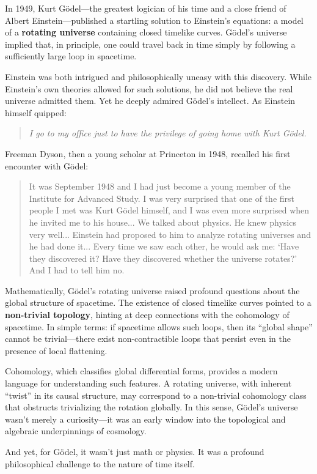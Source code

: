 \begin{tcolorbox}[colback=blue!5!white, colframe=blue!75!black, breakable, title={Sidebar: Gödel, Einstein, and the Rotating Universe}, fonttitle=\bfseries]

    In 1949, Kurt Gödel—the greatest logician of his time and a close friend of Albert Einstein—published a startling solution to Einstein’s equations: a model of a \textbf{rotating universe} containing closed timelike curves. Gödel’s universe implied that, in principle, one could travel back in time simply by following a sufficiently large loop in spacetime.

    \medskip
    
    Einstein was both intrigued and philosophically uneasy with this discovery. While Einstein's own theories allowed for such solutions, he did not believe the real universe admitted them. Yet he deeply admired Gödel’s intellect. As Einstein himself quipped:
    \begin{quote}
    \textit{I go to my office just to have the privilege of going home with Kurt Gödel.}
    \end{quote}
    
    Freeman Dyson, then a young scholar at Princeton in 1948, recalled his first encounter with Gödel:

    \begin{quote}
    \small
    It was September 1948 and I had just become a young member of the Institute for Advanced Study. I was very surprised that one of the first people I met was Kurt Gödel himself, and I was even more surprised when he invited me to his house... We talked about physics. He knew physics very well... Einstein had proposed to him to analyze rotating universes and he had done it... Every time we saw each other, he would ask me: ‘Have they discovered it? Have they discovered whether the universe rotates?’ And I had to tell him no.
    \end{quote}
    
    Mathematically, Gödel’s rotating universe raised profound questions about the global structure of spacetime. The existence of closed timelike curves pointed to a \textbf{non-trivial topology}, hinting at deep connections with the cohomology of spacetime. In simple terms: if spacetime allows such loops, then its “global shape” cannot be trivial—there exist non-contractible loops that persist even in the presence of local flattening.

    \medskip
    
    Cohomology, which classifies global differential forms, provides a modern language for understanding such features. A rotating universe, with inherent “twist” in its causal structure, may correspond to a non-trivial cohomology class that obstructs trivializing the rotation globally. In this sense, Gödel’s universe wasn’t merely a curiosity—it was an early window into the topological and algebraic underpinnings of cosmology.

    \medskip
    
    And yet, for Gödel, it wasn’t just math or physics. It was a profound philosophical challenge to the nature of time itself.
    
\end{tcolorbox}
